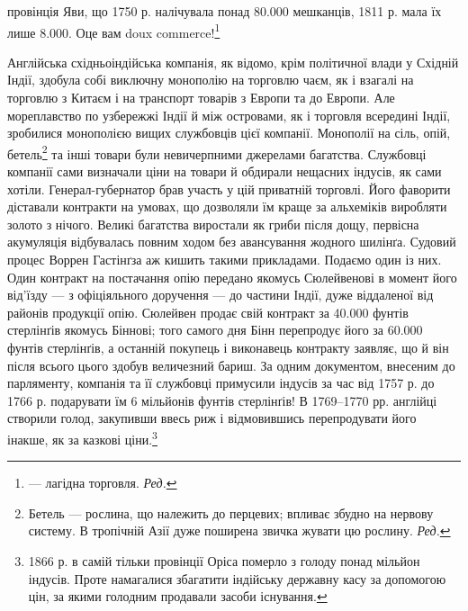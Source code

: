 \parcont{}  %
провінція Яви, що 1750 р. налічувала понад 80.000 мешканців,
1811 р. мала їх лише 8.000. Оце вам doux commerce!\footnote*{
— лагідна торговля. \emph{Ред.}
}

Англійська східньоіндійська компанія, як відомо, крім політичної
влади у Східній Індії, здобула собі виключну монополію
на торговлю чаєм, як і взагалі на торговлю з Китаєм і на транспорт
товарів з Европи та до Европи. Але мореплавство по узбережжі
Індії й між островами, як і торговля всередині Індії,
зробилися монополією вищих службовців цієї компанії. Монополії
на сіль, опій, бетель\footnote*{
Бетель — рослина, що належить до перцевих; впливає збудно на
нервову систему. В тропічній Азії дуже поширена звичка жувати цю рослину.
\emph{Ред.}
} та інші товари були невичерпними
джерелами багатства. Службовці компанії сами визначали ціни
на товари й обдирали нещасних індусів, як сами хотіли. Генерал-губернатор
брав участь у цій приватній торговлі. Його фаворити
діставали контракти на умовах, що дозволяли їм краще за альхеміків
виробляти золото з нічого. Великі багатства виростали
як гриби після дощу, первісна акумуляція відбувалась повним
ходом без авансування жодного шилінґа. Судовий процес Воррен
Гастінґза аж кишить такими прикладами. Подаємо один із
них. Один контракт на постачання опію передано якомусь Сюлейвенові
в момент його від’їзду — з офіціяльного доручення —
до частини Індії, дуже віддаленої від районів продукції опію.
Сюлейвен продає свій контракт за 40.000 фунтів стерлінґів якомусь
Біннові; того самого дня Бінн перепродує його за 60.000 фунтів
стерлінґів, а останній покупець і виконавець контракту заявляє,
що й він після всього цього здобув величезний бариш.
За одним документом, внесеним до парляменту, компанія та її
службовці примусили індусів за час від 1757 р. до 1766 р. подарувати
їм 6 мільйонів фунтів стерлінґів! В 1769--1770 рр.
англійці створили голод, закупивши ввесь риж і відмовившись
перепродувати його інакше, як за казкові ціни.\footnote{
1866 р. в самій тільки провінції Оріса померло з голоду понад
мільйон індусів. Проте намагалися збагатити індійську державну касу
за допомогою цін, за якими голодним продавали засоби існування.
}

